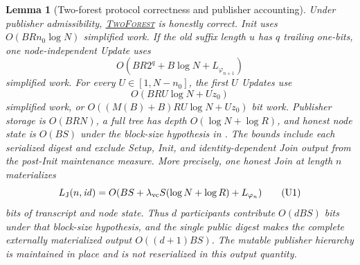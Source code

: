 \documentclass[11pt]{article}
\newtheorem{lemma}{Lemma}[section]
\begin{document}
\begin{lemma}[Two-forest protocol correctness and publisher accounting]
\label{lem:publisher}
Under publisher admissibility, \hyperref[alg:twoforest]{\textsc{TwoForest}}
is honestly correct.  Init uses $O(BRn_0\log N)$ simplified work.  If the old
suffix length $u$ has $q$ trailing one-bits, one node-independent Update uses
\[
 O(BR2^q+B\log N+L_{\varphi_{n+1}})
\tag{13}\label{eq:one-update}
\]
simplified work.  For every $U\in[1,N-n_0]$, the first $U$ Updates use
\[
 O(BRU\log N+Uz_0)
\tag{14}\label{eq:aggregate-update}
\]
simplified work, or
$O((M(B)+B)RU\log N+Uz_0)$ bit work.  Publisher storage is $O(BRN)$, a full
tree has depth $O(\log N+\log R)$, and honest node state is $O(BS)$ under the
block-size hypothesis in .  The bounds include each serialized
digest and exclude Setup, Init, and identity-dependent Join output from the
post-Init maintenance measure.  More precisely, one honest Join at length $n$
materializes
\[
 L_{\rm J}(n,\mathit{id})=
 O(BS+\lambda_{\rm vc}S(\log N+\log R)+L_{\varphi_n})
\tag{U1}\label{eq:join-output}
\]
bits of transcript and node state.  Thus $d$ participants contribute
$O(dBS)$ bits under that block-size hypothesis, and the single public digest
makes the complete externally materialized output $O((d+1)BS)$.  The mutable
publisher hierarchy is maintained in place and is not reserialized in this
output quantity.
\end{lemma}
\end{document}
